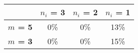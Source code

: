 \begin{tabular}{|l|c|c|c|}
\hline
&\textbf{$n_i$ = 3}&\textbf{$n_i$ = 2}&\textbf{$n_i$ = 1}\\\hline
\textbf{$m$ = 5}&0\%&0\%&13\%\\\hline
\textbf{$m$ = 3}&0\%&0\%&15\%\\\hline
\end{tabular}
